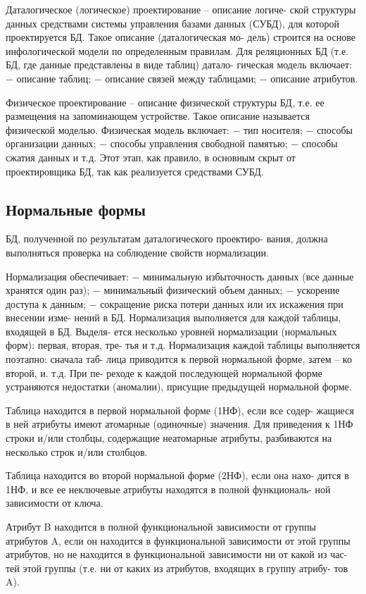 Даталогическое (логическое) проектирование – описание логиче-
ской структуры данных средствами системы управления базами данных
(СУБД), для которой проектируется БД. Такое описание (даталогическая мо-
дель) строится на основе инфологической модели по определенным правилам.
Для реляционных БД (т.е. БД, где данные представлены в виде таблиц) датало-
гическая модель включает:
− описание таблиц;
− описание связей между таблицами;
− описание атрибутов.

Физическое проектирование – описание физической структуры БД,
т.е. ее размещения на запоминающем устройстве. Такое описание называется
физической моделью. Физическая модель включает:
− тип носителя;
− способы организации данных;
− способы управления свободной памятью;
− способы сжатия данных и т.д.
Этот этап, как правило, в основным скрыт от проектировщика БД, так как
реализуется средствами СУБД.

\subsection{Нормальные формы}

БД, полученной по результатам даталогического проектиро-
вания, должна выполняться проверка на соблюдение свойств нормализации.

Нормализация обеспечивает:
− минимальную избыточность данных (все данные хранятся один раз);
− минимальный физический объем данных;
− ускорение доступа к данным;
− сокращение риска потери данных или их искажения при внесении изме-
нений в БД.
Нормализация выполняется для каждой таблицы, входящей в БД. Выделя-
ется несколько уровней нормализации (нормальных форм): первая, вторая, тре-
тья и т.д. Нормализация каждой таблицы выполняется поэтапно: сначала таб-
лица приводится к первой нормальной форме, затем – ко второй, и. т.д. При пе-
реходе к каждой последующей нормальной форме устраняются недостатки
(аномалии), присущие предыдущей нормальной форме.

Таблица находится в первой нормальной форме (1НФ), если все содер-
жащиеся в ней атрибуты имеют атомарные (одиночные) значения.
Для приведения к 1НФ строки и/или столбцы, содержащие неатомарные
атрибуты, разбиваются на несколько строк и/или столбцов.

Таблица находится во второй нормальной форме (2НФ), если она нахо-
дится в 1НФ, и все ее неключевые атрибуты находятся в полной функциональ-
ной зависимости от ключа.

Атрибут B находится в полной функциональной зависимости от группы
атрибутов A, если он находится в функциональной зависимости от этой группы
атрибутов, но не находится в функциональной зависимости ни от какой из час-
тей этой группы (т.е. ни от каких из атрибутов, входящих в группу атрибу-
тов A).

